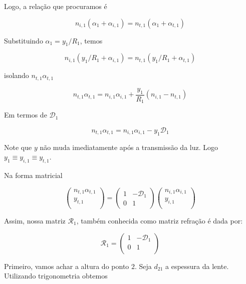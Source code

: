 \documentclass[11pt]{article}
\begin{document}
\begin{pproblem}
\begin{pssolution*}{}{}
\begin{alternativas}
            Logo, a relação que procuramos é 

            \[\boxed{n_{i,1}(\alpha_1+\alpha_{i,1}) = n_{t,1}(\alpha_1+\alpha_{t,1})}\]

            \item Substituindo \(\alpha_1 = y_1/R_1\), temos
            
            \[n_{i,1}(y_1/R_1+\alpha_{i,1})=n_{t,1}(y_1/R_1 +\alpha_{t,1})\]

            isolando \(n_{t,1}\alpha_{t,1}\)

            \[n_{t,1}\alpha_{t,1} = n_{i,1}\alpha_{i,1}+ \frac{y_1}{R_1}(n_{i,1}-n_{t,1})\]

            Em termos de \(\mathcal{D}_1\) 

            \[n_{t,1}\alpha_{t,1} = n_{i,1}\alpha_{i,1} - y_1\mathcal{D}_1\]

            Note que \(y\) não muda imediatamente após a transmissão da luz. Logo \(y_1\equiv y_{i,1}\equiv y_{t,1}\).

            \item Na forma matricial
            
            \[\left(\begin{matrix}
                n_{t,1}\alpha_{t,1} \\
                y_{t,1}\\
            \end{matrix}\right) = \left(\begin{matrix}
                1 & - \mathcal{D}_1 \\
                0 & 1
            \end{matrix}\right)\left(\begin{matrix}
                n_{i,1}\alpha_{i,1} \\
                y_{i,1}\\
            \end{matrix}\right)\]

            Assim, nossa matriz \(\mathcal{R}_1\), também conhecida como matriz refração é dada por:

            \[\boxed{\mathcal{R}_1 = \left(\begin{matrix}
            1 & -\mathcal{D}_1 \\
            0 & 1 \\
            \end{matrix}\right)}\]

        \item Primeiro, vamos achar a altura do ponto \(2\). Seja \(d_{21}\) a espessura da lente. Utilizando trigonometria obtemos
        

\end{alternativas}
\end{pssolution*}
\end{pproblem}
\end{document}
